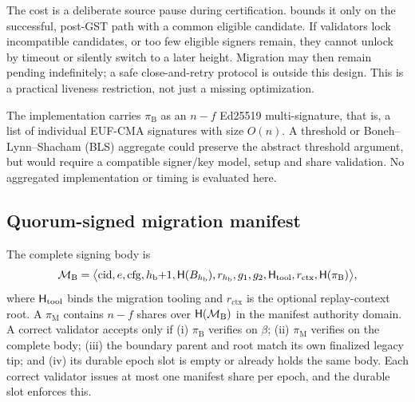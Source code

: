 The cost is a deliberate source pause during certification.  bounds it only on
the successful, post-GST path with a common eligible candidate. If validators lock incompatible
candidates, or too few eligible signers remain, they cannot unlock by timeout or silently switch to
a later height. Migration may then remain pending indefinitely; a safe close-and-retry protocol is
outside this design. This is a practical liveness restriction, not just a missing optimization.

The implementation carries $\pi_{\mathrm B}$ as an $n-f$ Ed25519 multi-signature, that is, a list of
individual EUF-CMA signatures with size $O(n)$. A threshold or Boneh--Lynn--Shacham (BLS) aggregate
could preserve the abstract threshold argument, but would require a compatible signer/key model,
setup and share validation. No aggregated implementation or timing is evaluated here.

\subsection{Quorum-signed migration manifest}
The complete signing body is
\begin{equation}
  \mathcal M_{\mathrm B}=\bigl\langle \mathrm{cid},e,\mathrm{cfg},h_{\mathrm b}{+}1,\mathsf{H}(B_{h_{\mathrm b}}),r_{h_{\mathrm b}},
  g_1,g_2,\mathsf{H}_{\mathrm{tool}},r_{\mathrm{ctx}},\mathsf{H}(\pi_{\mathrm B})\bigr\rangle ,
  \label{eq:manifest}
\end{equation}
where $\mathsf{H}_{\mathrm{tool}}$ binds the migration tooling and $r_{\mathrm{ctx}}$ is the optional
replay-context root. A \ManCert{} $\pi_{\mathrm M}$ contains $n-f$ shares over $\mathsf{H}(\mathcal M_{\mathrm
B})$ in the manifest authority domain. A correct validator accepts only if (i) $\pi_{\mathrm B}$
verifies on $\beta$; (ii) $\pi_{\mathrm M}$ verifies on the complete body; (iii) the boundary parent and
root match its own finalized legacy tip; and (iv) its durable epoch slot is empty or already holds
the same body. Each correct validator issues at most one manifest share per epoch, and the durable
slot enforces this.

